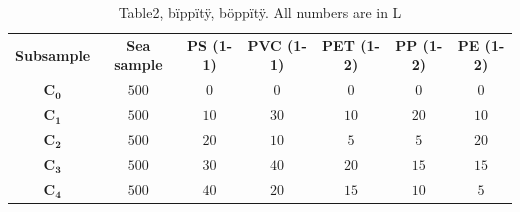 \documentclass[twocolumn,a4paper,aps,amsmath,amssymb,floatfix,superscriptaddress]{revtex4-2}
\begin{document}
	\begin{table}
		\centering
		\begin{threeparttable}
			\caption[table]{Table2, bïppïtÿ, böppïtÿ. All numbers are in \mu L}
			\label{tab:Subsample_make-up}
			\begin{tabular}{c||c|c|c|c|c|c}
				\textbf{Subsample} & \textbf{Sea sample } & \textbf{PS (1-1)} & \textbf{PVC (1-1)} & \textbf{PET (1-2)} & \textbf{PP (1-2)} & \textbf{PE (1-2)} \\
				\hhline{=======}
				 $\mathbf{C_0}$ & $500$ & $0$ & $0$ & $0$& $0$ & $0$ \\
				\hline
				  $\mathbf{C_1}$ & $500$ & $10$ & $30$ & $10$ & $20$ & $10$ \\
				\hline
				 $\mathbf{C_2}$ & $500$ & $20$ & $10$ & $5$ & $5$ & $20$ \\
				\hline
				 $\mathbf{C_3}$ & $500$ & $30$ & $40$ & $20$ & $15$ & $15$ \\
				\hline
				 $\mathbf{C_4}$ & $500$ & $40$ & $20$ & $15$ & $10$ & $5$ \\			
			\end{tabular}
		\end{threeparttable}
	\end{table}
	
\end{document}
